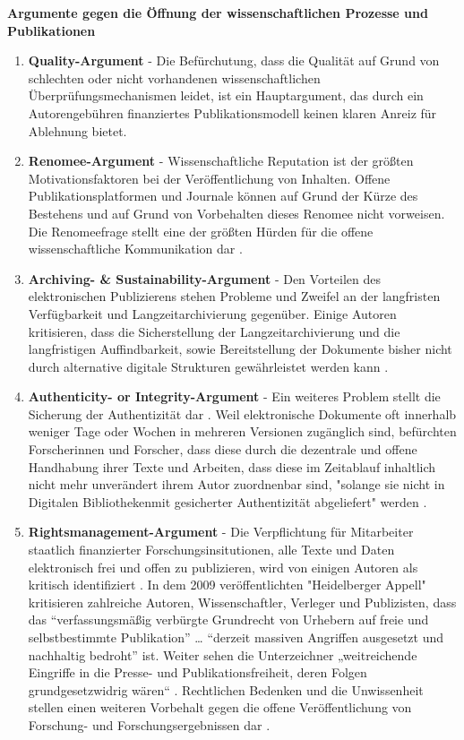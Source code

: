 \textbf{Argumente gegen die Öffnung der wissenschaftlichen Prozesse und Publikationen}
\begin{enumerate}
\item \textbf{Quality-Argument} - Die Befürchutung, dass die Qualität auf Grund von schlechten oder nicht vorhandenen wissenschaftlichen Überprüfungsmechanismen leidet, ist ein Hauptargument, das durch ein Autorengebühren finanziertes Publikationsmodell keinen klaren Anreiz für Ablehnung bietet.
\item \textbf{Renomee-Argument} - Wissenschaftliche Reputation ist der größten Motivationsfaktoren bei der Veröffentlichung von Inhalten. Offene Publikationsplatformen und Journale können auf Grund der Kürze des Bestehens und auf Grund von Vorbehalten dieses Renomee nicht vorweisen. Die Renomeefrage stellt eine der größten Hürden für die offene wissenschaftliche Kommunikation dar \cite{weishaupt_2009_goldenOA}.
\item \textbf{Archiving- & Sustainability-Argument} - Den Vorteilen des elektronischen Publizierens stehen Probleme und Zweifel an der langfristen Verfügbarkeit und Langzeitarchivierung \cite{weishaupt_2009_goldenOA} gegenüber. Einige Autoren kritisieren, dass die Sicherstellung der Langzeitarchivierung und die langfristigen Auffindbarkeit, sowie Bereitstellung der Dokumente bisher nicht durch alternative digitale Strukturen gewährleistet werden kann \cite{umstatter_2007_qualitatssicherung}. 
\item \textbf{Authenticity- or Integrity-Argument} - Ein weiteres Problem stellt die Sicherung der Authentizität dar \cite{umstatter_2007_qualitatssicherung} \cite{weishaupt_2009_goldenOA}. Weil elektronische Dokumente oft innerhalb weniger Tage oder Wochen in mehreren Versionen zugänglich sind, befürchten Forscherinnen und Forscher, dass diese durch die dezentrale und offene Handhabung ihrer Texte und Arbeiten, dass diese im Zeitablauf inhaltlich nicht mehr unverändert ihrem Autor zuordnenbar sind, "solange sie nicht in Digitalen Bibliothekenmit gesicherter Authentizität abgeliefert" werden \cite{umstatter_2007_qualitatssicherung}.
\item \textbf{Rightsmanagement-Argument} - Die Verpflichtung für Mitarbeiter staatlich finanzierter Forschungsinsitutionen, alle Texte und Daten elektronisch frei und offen zu publizieren, wird von einigen Autoren als kritisch identifiziert \cite{suchen}. In dem 2009 veröffentlichten "Heidelberger Appell" \cite{faz_heidelberger_apell_2009} kritisieren zahlreiche Autoren, Wissenschaftler, Verleger und Publizisten, dass das “verfassungsmäßig verbürgte Grundrecht von Urhebern auf freie und selbstbestimmte Publikation” … “derzeit massiven Angriffen ausgesetzt und nachhaltig bedroht” ist. Weiter sehen die Unterzeichner „weitreichende Eingriffe in die Presse- und Publikationsfreiheit, deren Folgen grundgesetzwidrig wären“ \cite{ITK_2009}. Rechtlichen Bedenken und die Unwissenheit stellen einen weiteren Vorbehalt gegen die offene Veröffentlichung von Forschung- und Forschungsergebnissen dar \cite{weishaupt_2009_goldenOA}.

\end{enumerate}
